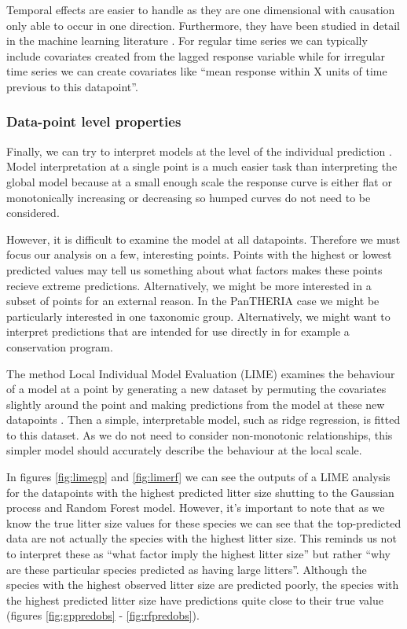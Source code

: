 \documentclass[10pt,]{article}
\begin{document}
Temporal effects are easier to handle as they are one dimensional with causation only able to occur in one direction. Furthermore, they have been studied in detail in the machine learning literature \citep{jeong2008non}. For regular time series we can typically include covariates created from the lagged response variable while for irregular time series we can create covariates like ``mean response within X units of time previous to this datapoint''.

\subsubsection{Data-point level properties}\label{data-point-level-properties}

Finally, we can try to interpret models at the level of the individual prediction \citep{lime, ribeiro2016should, lundberg2017unified, ribeiro2016nothing}. Model interpretation at a single point is a much easier task than interpreting the global model because at a small enough scale the response curve is either flat or monotonically increasing or decreasing so humped curves do not need to be considered.

However, it is difficult to examine the model at all datapoints. Therefore we must focus our analysis on a few, interesting points. Points with the highest or lowest predicted values may tell us something about what factors makes these points recieve extreme predictions. Alternatively, we might be more interested in a subset of points for an external reason. In the PanTHERIA case we might be particularly interested in one taxonomic group. Alternatively, we might want to interpret predictions that are intended for use directly in for example a conservation program.

The method Local Individual Model Evaluation (LIME) examines the behaviour of a model at a point by generating a new dataset by permuting the covariates slightly around the point and making predictions from the model at these new datapoints \citetext{\citealp{lime}; \citealp{ribeiro2016should}; \citealp[ ]{lundberg2017unified}; \citealp{ribeiro2016nothing}}. Then a simple, interpretable model, such as ridge regression, is fitted to this dataset. As we do not need to consider non-monotonic relationships, this simpler model should accurately describe the behaviour at the local scale.

In figures \ref{fig:limegp} and \ref{fig:limerf} we can see the outputs of a LIME analysis for the datapoints with the highest predicted litter size shutting to the Gaussian process and Random Forest model. However, it's important to note that as we know the true litter size values for these species we can see that the top-predicted data are not actually the species with the highest litter size. This reminds us not to interpret these as ``what factor imply the highest litter size'' but rather ``why are these particular species predicted as having large litters''. Although the species with the highest observed litter size are predicted poorly, the species with the highest predicted litter size have predictions quite close to their true value (figures \ref{fig:gppredobs} - \ref{fig:rfpredobs}).
\end{document}
